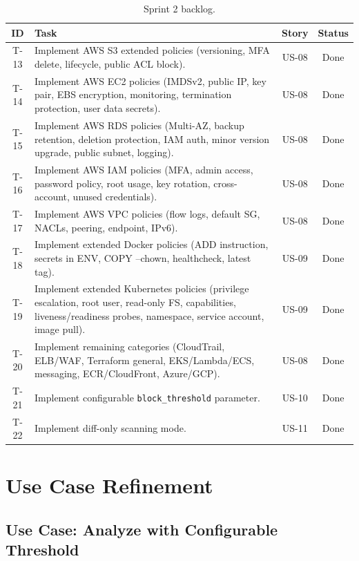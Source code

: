 \begin{table}[H]
\centering
\begin{tabularx}{\textwidth}{|c|X|c|c|}
\hline
\textbf{ID} & \textbf{Task} & \textbf{Story} & \textbf{Status} \\
\hline
T-13 & Implement AWS S3 extended policies (versioning, MFA delete, lifecycle, public ACL block). & US-08 & Done \\
\hline
T-14 & Implement AWS EC2 policies (IMDSv2, public IP, key pair, EBS encryption, monitoring, termination protection, user data secrets). & US-08 & Done \\
\hline
T-15 & Implement AWS RDS policies (Multi-AZ, backup retention, deletion protection, IAM auth, minor version upgrade, public subnet, logging). & US-08 & Done \\
\hline
T-16 & Implement AWS IAM policies (MFA, admin access, password policy, root usage, key rotation, cross-account, unused credentials). & US-08 & Done \\
\hline
T-17 & Implement AWS VPC policies (flow logs, default SG, NACLs, peering, endpoint, IPv6). & US-08 & Done \\
\hline
T-18 & Implement extended Docker policies (ADD instruction, secrets in ENV, COPY --chown, healthcheck, latest tag). & US-09 & Done \\
\hline
T-19 & Implement extended Kubernetes policies (privilege escalation, root user, read-only FS, capabilities, liveness/readiness probes, namespace, service account, image pull). & US-09 & Done \\
\hline
T-20 & Implement remaining categories (CloudTrail, ELB/WAF, Terraform general, EKS/Lambda/ECS, messaging, ECR/CloudFront, Azure/GCP). & US-08 & Done \\
\hline
T-21 & Implement configurable \texttt{block\_threshold} parameter. & US-10 & Done \\
\hline
T-22 & Implement diff-only scanning mode. & US-11 & Done \\
\hline
\end{tabularx}
\caption{Sprint 2 backlog.}
\label{tab:s2-backlog}
\end{table}


\section{Use Case Refinement}

\subsection{Use Case: Analyze with Configurable Threshold}


